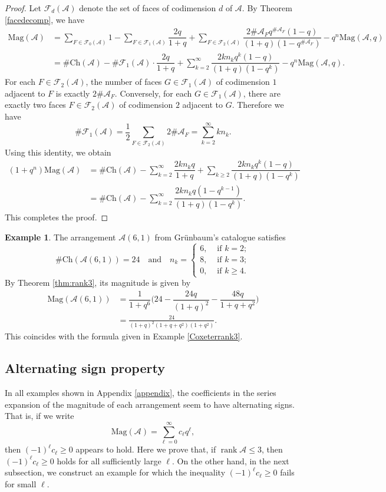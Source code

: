 \documentclass{amsart}
\numberwithin{equation}{section}
\theoremstyle{plain}
\theoremstyle{remark}
\theoremstyle{definition}
\newtheorem{ex}[thm]{Example}
\numberwithin{equation}{section}
\newcommand{\A}{\mathcal{A}}
\newcommand{\FF}{\mathcal{F}}
\newcommand{\Mag}{\mathrm{Mag}}
\newcommand{\Ch}{\mathrm{Ch}}
\DeclareMathOperator{\rank}{rank}
\begin{document}
\begin{proof}
    Let $\FF_d(\A)$ denote the set of faces of codimension $d$ of $\A$.
    By Theorem \ref{facedecomp}, we have
    \begin{align*}
    \Mag(\A)&{}=\sum_{F\in \FF_0(\A)}1-\sum_{F\in \FF_1(\A)}\dfrac{2q}{1+q}+\sum_{F\in \FF_2(\A)}\dfrac{2\#\A_Fq^{\#\A_F}(1-q)}{(1+q)(1-q^{\#\A_F})}-q^n\Mag(\A,q)\\
    &{}=\#\Ch(\A)-\#\FF_1(\A)\cdot \dfrac{2q}{1+q}+\sum_{k=2}^\infty\dfrac{2kn_kq^k(1-q)}{(1+q)(1-q^k)}-q^n\Mag(\A,q).
    \end{align*}
    For each $F\in \FF_2(\A)$, the number of faces $G\in \FF_1(\A)$ of codimension $1$ adjacent to $F$ is exactly $2\#\A_F$.
    Conversely, for each $G\in \FF_1(\A)$, there are exactly two faces $F\in \FF_2(\A)$ of codimension $2$ adjacent to $G$.
    Therefore we have
    \[
    \#\FF_1(\A)=\dfrac{1}{2}\sum_{F\in \FF_2(\A)}2\#\A_F=\sum_{k=2}^\infty kn_k.
    \]
    Using this identity, we obtain
    \begin{align*}
    (1+q^n)\Mag(\A)&{}=\#\Ch(\A)-\sum_{k=2}^\infty\dfrac{2kn_kq}{1+q}+\sum_{k\geq 2}\dfrac{2kn_kq^k(1-q)}{(1+q)(1-q^k)}\\
    &{}=\#\Ch(\A)-\sum_{k=2}^\infty\dfrac{2kn_kq(1-q^{k-1})}{(1+q)(1-q^k)}.
    \end{align*}
    This completes the proof.
\end{proof}

\begin{ex}
    The arrangement $\A(6,1)$ from Gr\"unbaum's catalogue \cite{Grunbaum2009} satisfies
    \[
    \#\Ch(\A(6,1))=24\quad\text{and}\quad
    n_k=\begin{cases}
        6,&\text{ if }k=2;\\
        8,&\text{ if }k=3;\\
        0,&\text{ if }k\geq 4.
    \end{cases}
    \]
    By Theorem \ref{thm:rank3}, its magnitude is given by
    \begin{align*}
        \Mag(\A(6,1))&{}=\dfrac{1}{1+q^6}\biggl(24-\dfrac{24q}{(1+q)^2}-\dfrac{48q}{1+q+q^2}\biggr)\\
        &{}=\frac{24}{(1+q)^2(1+q+q^2)(1+q^2)}.
    \end{align*}
    This coincides with the formula given in Example \ref{Coxeterrank3}.
\end{ex}

\subsection{Alternating sign property}
In all examples shown in Appendix \ref{appendix}, the coefficients in the series expansion of the magnitude of each arrangement seem to have alternating signs. That is, if we write
\[
\Mag(\A)=\sum_{\ell=0}^\infty c_\ell q^\ell,
\]
then $(-1)^\ell c_\ell\geq 0$ appears to hold.
Here we prove that, if $\rank \A\leq 3$, then $(-1)^\ell c_\ell\geq 0$ holds for all sufficiently large $\ell$.
On the other hand, in the next subsection, we construct an example for which the inequality
$(-1)^\ell c_\ell \geq 0$
fails for small $\ell$.
\end{document}
